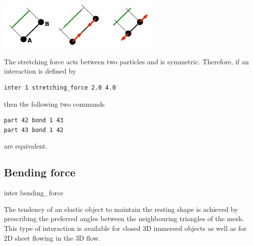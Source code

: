 \begin{center}
  \includegraphics[width=8cm]{figures/stretching.png}
\end{center}
The stretching force acts between two particles and is symmetric. Therefore, if an interaction is defined by
\begin{verbatim} 
inter 1 stretching_force 2.0 4.0
\end{verbatim}
then the following two commands
\begin{verbatim} 
part 42 bond 1 43
part 43 bond 1 42
\end{verbatim}
are equivalent.





\subsection{Bending force}

\begin{essyntax}
  inter 
  bending_force
   
\end{essyntax}

The tendency of an elastic object to maintain the resting shape is achieved by 
prescribing the preferred angles between the neighbouring triangles of the mesh. 
This type of interaction is available for closed 3D immersed objects as well as 
for 2D sheet flowing in the 3D flow.


